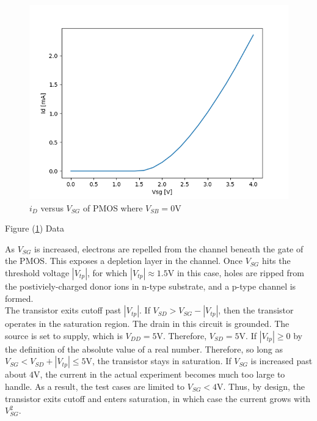 
\FloatBarrier

\begin{figure}[h!]
	\centering
	\includegraphics[scale=0.75]{../images/data_3.PNG}
	\caption{$i_{D}$ versus $V_{SG}$ of PMOS where $V_{SB}= 0$\si{\volt}}
	\label{fig:data_3}
\end{figure}

\FloatBarrier

\FloatBarrier

\begin{table}[h!]
	\centering
	\caption{Figure (\ref{fig:data_3}) Data}
	\label{tab:data_3}
\end{table}

\FloatBarrier

As $V_{SG}$ is increased, electrons are repelled from the channel beneath the gate of the PMOS.
This exposes a depletion layer in the channel.
Once $V_{SG}$ hits the threshold voltage $|V_{tp}|$, for which $|V_{tp}| \approx 1.5$\si{\volt} in this case, holes are ripped from the postiviely-charged donor ions in n-type substrate, and a p-type channel is formed. \\

The transistor exits cutoff past $|V_{tp}|$.
If $V_{SD} > V_{SG} - |V_{tp}|$, then the transistor operates in the saturation region.
The drain in this circuit is grounded.
The source is set to supply, which is $V_{DD} = 5$\si{\volt}.
Therefore, $V_{SD} = 5$\si{\volt}.
If $|V_{tp}| \geq 0$ by the definition of the absolute value of a real number.
Therefore, so long as $V_{SG} < V_{SD} + |V_{tp}| \leq 5$\si{\volt}, the transistor stays in saturation.
If $V_{SG}$ is increased past about $4$\si{\volt}, the current in the actual experiment becomes much too large to handle.
As a result, the test cases are limited to $V_{SG} < 4$\si{\volt}.
Thus, by design, the transistor exits cutoff and enters saturation, in which case the current grows with $V_{SG}^{2}$. \\

